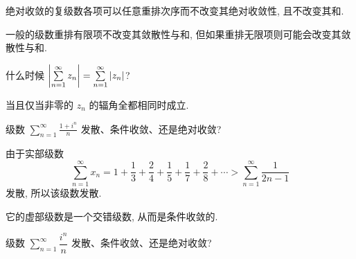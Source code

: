 \documentclass[nocolor,theme=doremi,lang=cn,11pt,chinese,twoside,openright,usesamecnt]{elegantbook}
\begin{document}

绝对收敛的复级数各项可以任意重排次序而不改变其绝对收敛性, 且不改变其和.

一般的级数重排有限项不改变其敛散性与和, 但如果重排无限项则可能会改变其敛散性与和.

\begin{thinking}
	什么时候 $\left|\sum\limits_{n=1}^\infty z_n\right|=\sum\limits_{n=1}^\infty|z_n|$?
\end{thinking}

\begin{answer}
	当且仅当非零的 $z_n$ 的辐角全都相同时成立.
\end{answer}

\begin{example}
	级数 $\displaystyle\sum_{n=1}^\infty\frac{1+i^n}n$ 发散、条件收敛、还是绝对收敛?
\end{example}

\begin{solution}
	由于实部级数
	\[\sum_{n=1}^\infty x_n=
	1+\frac13+\frac24+\frac15+\frac17+\frac28+\cdots>\sum_{n=1}^\infty\frac1{2n-1}\]
	发散, 所以该级数发散.
\end{solution}

它的虚部级数是一个交错级数, 从而是条件收敛的.

\begin{example}
	级数 $\displaystyle\sum_{n=1}^\infty\dfrac{i^n}n$ 发散、条件收敛、还是绝对收敛?
\end{example}
\end{document}
